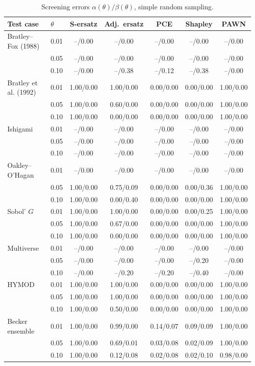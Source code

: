 \documentclass[11pt,a4paper]{article}
\begin{document}
\begin{table}[H]\centering\footnotesize
\begin{tabular}{@{}llccccc@{}}\toprule
Test case & $\theta$ & S-ersatz & Adj.\ ersatz & PCE & Shapley & PAWN \\ \midrule
Bratley--Fox (1988) & 0.01 & --/0.00 & --/0.00 & --/0.00 & --/0.00 & --/0.00 \\
 & 0.05 & --/0.00 & --/0.00 & --/0.00 & --/0.00 & --/0.00 \\
 & 0.10 & --/0.00 & --/0.38 & --/0.12 & --/0.38 & --/0.00 \\
\addlinespace[2pt]
Bratley et al. (1992) & 0.01 & 1.00/0.00 & 1.00/0.00 & 0.00/0.00 & 0.00/0.00 & 1.00/0.00 \\
 & 0.05 & 1.00/0.00 & 0.60/0.00 & 0.00/0.00 & 0.00/0.00 & 1.00/0.00 \\
 & 0.10 & 1.00/0.00 & 0.00/0.00 & 0.00/0.00 & 0.00/0.00 & 1.00/0.00 \\
\addlinespace[2pt]
Ishigami & 0.01 & --/0.00 & --/0.00 & --/0.00 & --/0.00 & --/0.00 \\
 & 0.05 & --/0.00 & --/0.00 & --/0.00 & --/0.00 & --/0.00 \\
 & 0.10 & --/0.00 & --/0.00 & --/0.00 & --/0.00 & --/0.00 \\
\addlinespace[2pt]
Oakley--O'Hagan & 0.01 & --/0.00 & --/0.00 & --/0.00 & --/0.00 & --/0.00 \\
 & 0.05 & 1.00/0.00 & 0.75/0.09 & 0.00/0.00 & 0.00/0.36 & 1.00/0.00 \\
 & 0.10 & 1.00/0.00 & 0.00/0.40 & 0.00/0.00 & 0.00/0.00 & 1.00/0.00 \\
\addlinespace[2pt]
Sobol' $G$ & 0.01 & 1.00/0.00 & 1.00/0.00 & 0.00/0.00 & 0.00/0.25 & 1.00/0.00 \\
 & 0.05 & 1.00/0.00 & 0.67/0.00 & 0.00/0.00 & 0.00/0.00 & 1.00/0.00 \\
 & 0.10 & 1.00/0.00 & 0.00/0.00 & 0.00/0.00 & 0.00/0.00 & 1.00/0.00 \\
\addlinespace[2pt]
Multiverse & 0.01 & --/0.00 & --/0.00 & --/0.00 & --/0.00 & --/0.00 \\
 & 0.05 & --/0.00 & --/0.00 & --/0.00 & --/0.20 & --/0.00 \\
 & 0.10 & --/0.00 & --/0.20 & --/0.20 & --/0.40 & --/0.00 \\
\addlinespace[2pt]
HYMOD & 0.01 & 1.00/0.00 & 1.00/0.00 & 0.00/0.00 & 0.00/0.00 & 1.00/0.00 \\
 & 0.05 & 1.00/0.00 & 1.00/0.00 & 0.00/0.00 & 0.00/0.00 & 1.00/0.00 \\
 & 0.10 & 1.00/0.00 & 0.50/0.00 & 0.00/0.00 & 0.00/0.00 & 1.00/0.00 \\
\addlinespace[2pt]
Becker ensemble & 0.01 & 1.00/0.00 & 0.99/0.00 & 0.14/0.07 & 0.09/0.09 & 1.00/0.00 \\
 & 0.05 & 1.00/0.00 & 0.69/0.01 & 0.03/0.08 & 0.02/0.09 & 1.00/0.00 \\
 & 0.10 & 1.00/0.00 & 0.12/0.08 & 0.02/0.08 & 0.02/0.10 & 0.98/0.00 \\
\bottomrule\end{tabular}
\caption{Screening errors $\alpha(\theta)/\beta(\theta)$, simple random sampling.}
\label{tab:scr_srs}
\end{table}
\end{document}
